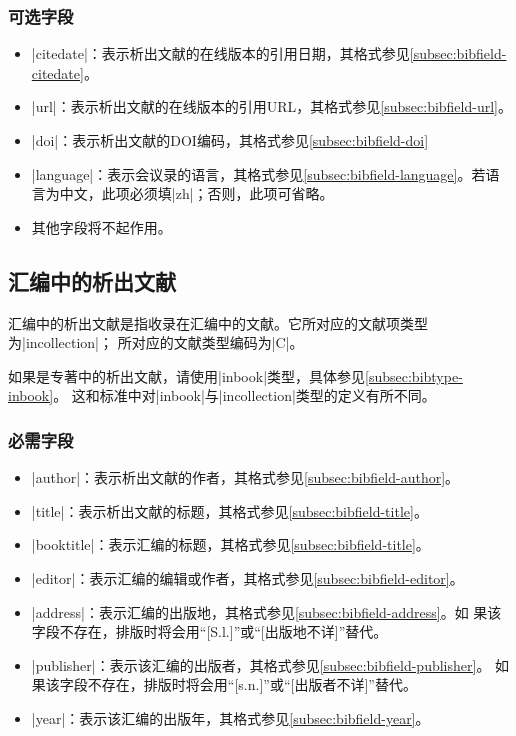 \subsubsection{可选字段}

\begin{itemize}
\item |citedate|：表示析出文献的在线版本的引用日期，其格式参见\ref{subsec:bibfield-citedate}。
\item |url|：表示析出文献的在线版本的引用URL，其格式参见\ref{subsec:bibfield-url}。
\item |doi|：表示析出文献的DOI编码，其格式参见\ref{subsec:bibfield-doi}
\item |language|：表示会议录的语言，其格式参见\ref{subsec:bibfield-language}。若语
  言为中文，此项必须填|zh|；否则，此项可省略。
\item 其他字段将不起作用。
\end{itemize}


\subsection{汇编中的析出文献}\label{subsec:bibtype-incollection}

汇编中的析出文献是指收录在汇编中的文献。它所对应的{\BibTeX}文献项类型为|incollection|；
所对应的文献类型编码为|C|\cite{gbt3469-1983}。

\begin{note}
如果是专著中的析出文献，请使用|inbook|类型，具体参见\ref{subsec:bibtype-inbook}。
这和标准{\BibTeX}中对|inbook|与|incollection|类型的定义有所不同。
\end{note}

\subsubsection{必需字段}

\begin{itemize}
\item |author|：表示析出文献的作者，其格式参见\ref{subsec:bibfield-author}。
\item |title|：表示析出文献的标题，其格式参见\ref{subsec:bibfield-title}。
\item |booktitle|：表示汇编的标题，其格式参见\ref{subsec:bibfield-title}。
\item |editor|：表示汇编的编辑或作者，其格式参见\ref{subsec:bibfield-editor}。
\item |address|：表示汇编的出版地，其格式参见\ref{subsec:bibfield-address}。如
  果该字段不存在，{\BibTeX}排版时将会用``[S.l.]''或``[出版地不详]''替代。
\item |publisher|：表示该汇编的出版者，其格式参见\ref{subsec:bibfield-publisher}。
  如果该字段不存在，{\BibTeX}排版时将会用``[s.n.]''或``[出版者不详]''替代。
\item |year|：表示该汇编的出版年，其格式参见\ref{subsec:bibfield-year}。
\end{itemize}

